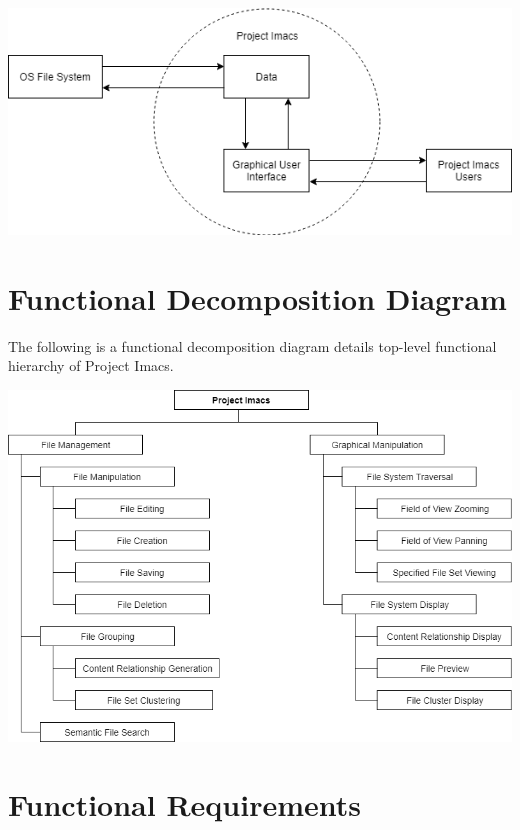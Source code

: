 \documentclass{article}
\begin{document}
\includegraphics[scale=0.5]{context_diagram.png}

\section{Functional Decomposition Diagram}
The following is a functional decomposition diagram details top-level functional hierarchy of Project Imacs.

\includegraphics[scale=0.5]{functional_decomposition_diagram.png}

\newpage
\section{Functional Requirements}
\end{document}
